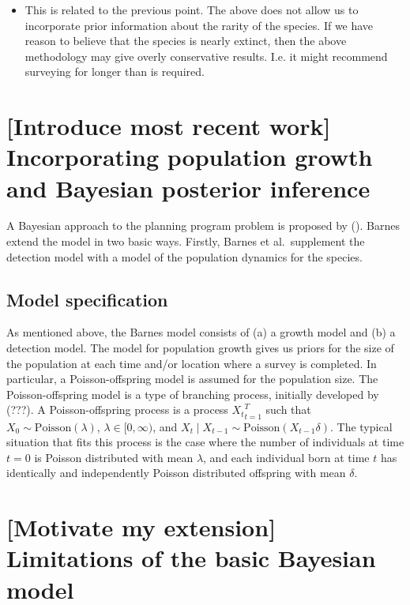 \documentclass[
]{book}
\providecommand{\tightlist}{%
  \setlength{\itemsep}{0pt}\setlength{\parskip}{0pt}}
\begin{document}
\begin{itemize}
\tightlist
\item
  This is related to the previous point. The above does not allow us to incorporate prior information about the rarity of the species. If we have reason to believe that the species is nearly extinct, then the above methodology may give overly conservative results. I.e. it might recommend surveying for longer than is required.
\end{itemize}

\hypertarget{introduce-most-recent-work-incorporating-population-growth-and-bayesian-posterior-inference}{%
\section{{[}Introduce most recent work{]} Incorporating population growth and Bayesian posterior inference}\label{introduce-most-recent-work-incorporating-population-growth-and-bayesian-posterior-inference}}

A Bayesian approach to the planning program problem is proposed by (\citet{barnes2022analytical}). Barnes extend the model in two basic ways. Firstly, Barnes et al.~supplement the detection model with a model of the population dynamics for the species.

\hypertarget{model-specification}{%
\subsection{Model specification}\label{model-specification}}

As mentioned above, the Barnes model consists of (a) a growth model and (b) a detection model. The model for population growth gives us priors for the size of the population at each time and/or location where a survey is completed. In particular, a Poisson-offspring model is assumed for the population size. The Poisson-offspring model is a type of branching process, initially developed by (???). A Poisson-offspring process is a process \({X_t}_{t=1}^T\) such that \(X_0 \sim \mathrm{Poisson}(\lambda)\), \(\lambda \in [0, \infty)\), and \(X_t \mid X_{t-1} \sim \mathrm{Poisson}(X_{t-1} \delta)\). The typical situation that fits this process is the case where the number of individuals at time \(t=0\) is Poisson distributed with mean \(\lambda\), and each individual born at time \(t\) has identically and independently Poisson distributed offspring with mean \(\delta\).

\hypertarget{motivate-my-extension-limitations-of-the-basic-bayesian-model}{%
\section{{[}Motivate my extension{]} Limitations of the basic Bayesian model}\label{motivate-my-extension-limitations-of-the-basic-bayesian-model}}
\end{document}
